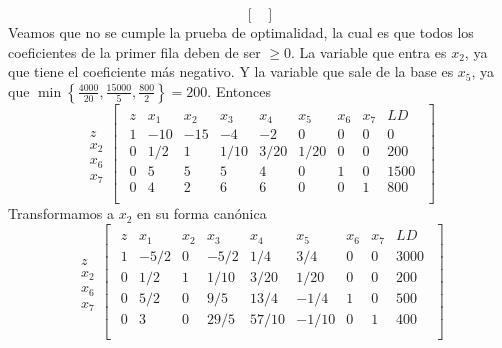 \documentclass[11pt,letterpaper]{article}
\begin{document}
\begin{enumerate}
\begin{equation}
\begin{bmatrix}
\end{bmatrix}
\end{equation}
Veamos que no se cumple la prueba de optimalidad, la cual es que todos los coeficientes de la primer fila deben de ser $\geq 0$. La variable que entra es $x_2$, ya que tiene el coeficiente más negativo. Y la variable que sale de la base es $x_5$, ya que $\min\left\{\frac{4000}{20} ,\frac{15000}{5},\frac{800}{2}\right\}= 200.$ Entonces
\begin{equation}
\begin{array}{c}
\\
z \\ 
x_2 \\
x_6 \\
x_7
\end{array}
\begin{bmatrix}
\begin{array}{c||cccccccc}
  z & x_1 & x_2 & x_3 & x_4 & x_5 & x_6 & x_7 & LD\\ \hline \hline
  1 &-10 &-15 &-4 &-2 & 0 & 0 & 0 & 0\\ 
  0 & 1/2 & 1 & 1/10 & 3/20 & 1/20 & 0 & 0 & 200  \\
  0 &  5 &  5 & 5 & 4 & 0 & 1 & 0 & 1500 \\
  0 &  4 &  2 & 6 & 6 & 0 & 0 & 1 & 800 \\
\end{array}
\end{bmatrix}
\end{equation}
Transformamos a $x_2$ en su forma canónica
\begin{equation}
\begin{array}{c}
\\
z \\ 
x_2 \\
x_6 \\
x_7
\end{array}
\begin{bmatrix}
\begin{array}{c||cccccccc}
  z & x_1 & x_2 & x_3 & x_4 & x_5 & x_6 & x_7 & LD\\ \hline \hline
  1 &-5/2 & 0 &-5/2 &1/4 & 3/4 & 0 & 0 & 3000\\ 
  0 & 1/2 & 1 & 1/10 & 3/20 & 1/20 & 0 & 0 & 200  \\
  0 &  5/2 &  0 & 9/5 & 13/4 & -1/4 & 1 & 0 & 500 \\
  0 &  3 &  0 & 29/5 & 57/10 & -1/10 & 0 & 1 & 400 \\
\end{array}
\end{bmatrix}

\end{equation}
\end{enumerate}
\end{document}
